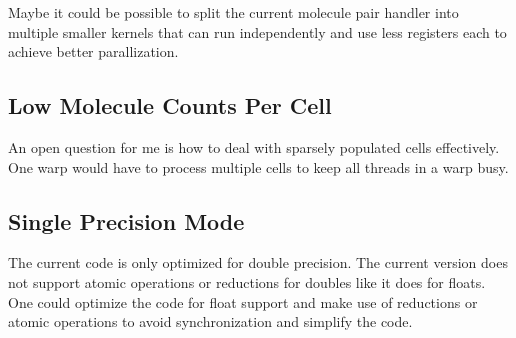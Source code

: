 Maybe it could be possible to split the current molecule pair handler into multiple smaller kernels that can run independently and use less registers each to achieve better parallization.

\subsection{Low Molecule Counts Per Cell}
An open question for me is how to deal with sparsely populated cells effectively. One warp would have to process multiple cells to keep all threads in a warp busy.

\subsection{Single Precision Mode}
The current code is only optimized for double precision. The current \cuda{} version does not support atomic operations or reductions for doubles like it does for floats. One could optimize the code for float support and make use of reductions or atomic operations to avoid synchronization and simplify the code.